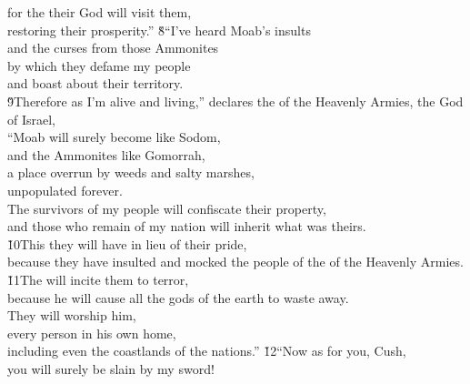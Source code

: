 \begin{poetry}
\poeml for the  their God will visit them, \\
\poemll    restoring their prosperity.''
\poeml \v{8}``I've heard Moab's insults \\
\poemll    and the curses from those Ammonites \\
\poeml by which they defame my people \\
\poemll    and boast about their territory. \\
\poeml \v{9}Therefore as I'm alive and living,'' declares the  of the Heavenly Armies, the God of Israel, \\
\poemll    ``Moab will surely become like Sodom, \\
\poemlll       and the Ammonites like Gomorrah, \\
\poeml a place overrun by weeds and salty marshes, \\
\poemll    unpopulated forever. \\
\poeml The survivors of my people will confiscate their property, \\
\poemll    and those who remain of my nation will inherit what was theirs. \\
\poeml \v{10}This they will have in lieu of their pride, \\
\poemll    because they have insulted and mocked the people of the  of the Heavenly Armies. \\
\poeml \v{11}The  will incite them to terror, \\
\poemll    because he will cause all the gods of the earth to waste away. \\
\poeml They will worship him, \\
\poemll    every person in his own home, \\
\poemlll       including even the coastlands of the nations.''
\poeml \v{12}``Now as for you, Cush, \\
\poemll    you will surely be slain by my sword! \\

\end{poetry}
